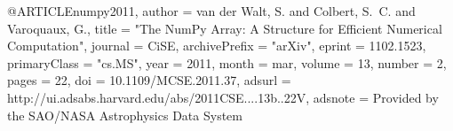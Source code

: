 
@ARTICLE{numpy2011,
   author = {{van der Walt}, S. and {Colbert}, S.~C. and {Varoquaux}, G.},
    title = "{The NumPy Array: A Structure for Efficient Numerical Computation}",
  journal = {CiSE},
archivePrefix = "arXiv",
   eprint = {1102.1523},
 primaryClass = "cs.MS",
     year = 2011,
    month = mar,
   volume = 13,
   number = 2,
    pages = {22},
      doi = {10.1109/MCSE.2011.37},
   adsurl = {http://ui.adsabs.harvard.edu/abs/2011CSE....13b..22V},
  adsnote = {Provided by the SAO/NASA Astrophysics Data System}
}
